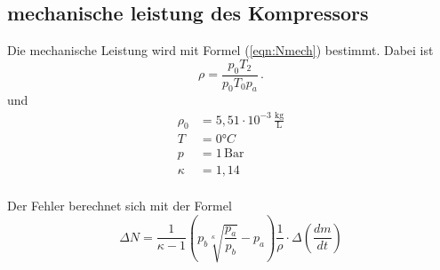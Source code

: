 

\subsection{mechanische leistung des Kompressors}
Die mechanische Leistung wird mit Formel (\ref{eqn:Nmech}) bestimmt.
Dabei ist
\begin{equation*}
  \rho = \frac{p_0T_2}{p_0T_0p_a}\, .
\end{equation*}
und
\begin{align*}
  \rho _0 &= 5,51\cdot 10^{-3} \,\mathrm{\frac{kg}{L}}\\
  T &= 0°C \\
  p &= 1\, \mathrm{Bar}\\
  \kappa &= 1,14
\end{align*}
\cite{on1}\\

Der Fehler berechnet sich mit der Formel
\begin{equation*}
  \Delta  N = \frac{1}{\kappa - 1} \left( p_b \sqrt[\kappa]{\frac{p_a}{p_b}} - p_a \right)
  \frac{1}{\rho}\cdot \Delta \left(\frac{dm}{dt}\right)
\end{equation*}





